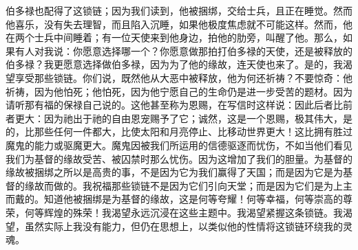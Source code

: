 伯多禄也配得了这锁链；因为我们读到，他被捆绑，交给士兵，且正在睡觉。然而他喜乐，没有失去理智，而且陷入沉睡，如果他极度焦虑就不可能这样。然而，他在两个士兵中间睡着；有一位天使来到他身边，拍他的肋旁，叫醒了他。那么，如果有人对我说：你愿意选择哪一个？你愿意做那拍打伯多禄的天使，还是被释放的伯多禄？我更愿意选择做伯多禄，因为为了他的缘故，连天使也来了。是的，我渴望享受那些锁链。你们说，既然他从大恶中被释放，他为何还祈祷？不要惊奇：他祈祷，因为他怕死；他怕死，因为他宁愿自己的生命仍是进一步受苦的题材。因为请听那有福的保禄自己说的。这他甚至称为恩赐，在写信时这样说：因此后者比前者更大：因为祂出于祂的自由恩宠赐予了它；诚然，这是一个恩赐，极其伟大，是的，比那些任何一件都大，比使太阳和月亮停止、比移动世界更大！这比拥有胜过魔鬼的能力或驱魔更大。魔鬼因被我们所运用的信德驱逐而忧伤，不如当他们看见我们为基督的缘故受苦、被囚禁时那么忧伤。因为这增加了我们的胆量。为基督的缘故被捆绑之所以是高贵的事，不是因为它为我们赢得了天国；而是因为它是为基督的缘故而做的。我祝福那些锁链不是因为它们引向天堂；而是因为它们是为上主而戴的。知道他被捆绑是为基督的缘故，这是何等夸耀！何等幸福，何等崇高的尊荣，何等辉煌的殊荣！我渴望永远沉浸在这些主题中。我渴望紧握这条锁链。我渴望，虽然实际上我没有能力，但仍在思想上，以类似他的性情将这锁链环绕我的灵魂。\par

